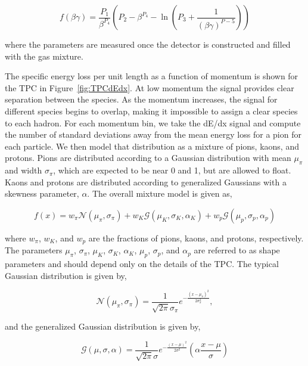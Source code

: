 \begin{equation}
    f(\beta\gamma) = \frac{P_1}{\beta^{P_4}} \left(P_2 - \beta^{P_4} - \ln\left(P_3+\frac{1}{(\beta\gamma)^{P-5}}\right)\right)
\end{equation}

\noindent where the parameters are measured once the detector is constructed and filled with the gas mixture. 

The specific energy loss per unit length as a function of momentum is shown for the TPC in Figure~\ref{fig:TPCdEdx}. At low momentum the signal provides clear separation between the species. As the momentum increases, the signal for different species begins to overlap, making it impossible to assign a clear species to each hadron. For each momentum bin, we take the dE/dx signal and compute the number of standard deviations away from the mean energy loss for a pion for each particle. We then model that distribution as a mixture of pions, kaons, and protons. Pions are distributed according to a Gaussian distribution with mean $\mu_{\pi}$ and width $\sigma_{\pi}$, which are expected to be near 0 and 1, but are allowed to float. Kaons and protons are distributed according to generalized Gaussians with a skewness parameter, $\alpha$. The overall mixture model is given as,

\begin{equation}
    f(x) = w_\pi \mathcal{N}(\mu_\pi, \sigma_\pi) + w_K \mathcal{G}(\mu_K, \sigma_K, \alpha_K) + w_p \mathcal{G}(\mu_p, \sigma_p, \alpha_p)
\end{equation}

\noindent where $w_\pi$, $w_K$, and $w_p$ are the fractions of pions, kaons, and protons, respectively. The parameters  $\mu_\pi$, $\sigma_\pi$, $\mu_K$, $\sigma_K$, $\alpha_K$, $\mu_p$, $\sigma_p$, and $\alpha_p$ are referred to as shape parameters and should depend only on the details of the TPC. The typical Gaussian distribution is given by,

\begin{equation}
    \mathcal{N}(\mu_\pi, \sigma_\pi) = \frac{1}{\sqrt{2\pi}\sigma_\pi}e^{-\frac{(x-\mu_\pi)^2}{2\sigma_\pi^2}},
\end{equation}

\noindent and the generalized Gaussian distribution is given by,

\begin{equation}
    \mathcal{G}(\mu, \sigma, \alpha) = \frac{1}{\sqrt{2\pi}\sigma}e^{-\frac{(x-\mu)^2}{2\sigma^2}}\left(\alpha \frac{x-\mu}{\sigma}\right)
\end{equation}

